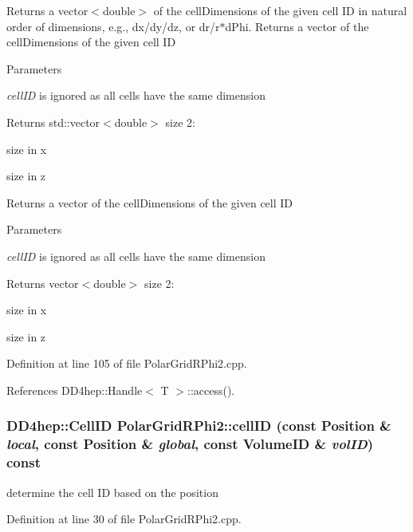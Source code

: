 Returns a vector$<$double$>$ of the cellDimensions of the given cell ID in natural order of dimensions, e.g., dx/dy/dz, or dr/r$\ast$dPhi. Returns a vector of the cellDimensions of the given cell ID 
\begin{DoxyParams}{Parameters}
\item[{\em cellID}]is ignored as all cells have the same dimension \end{DoxyParams}
\begin{DoxyReturn}{Returns}
std::vector$<$double$>$ size 2:
\begin{DoxyEnumerate}
\item size in x
\item size in z
\end{DoxyEnumerate}
\end{DoxyReturn}
Returns a vector of the cellDimensions of the given cell ID 
\begin{DoxyParams}{Parameters}
\item[{\em cellID}]is ignored as all cells have the same dimension \end{DoxyParams}
\begin{DoxyReturn}{Returns}
vector$<$double$>$ size 2:
\begin{DoxyEnumerate}
\item size in x
\item size in z 
\end{DoxyEnumerate}
\end{DoxyReturn}


Definition at line 105 of file PolarGridRPhi2.cpp.

References DD4hep::Handle$<$ T $>$::access().\hypertarget{class_d_d4hep_1_1_geometry_1_1_polar_grid_r_phi2_a26ecb558de4d95a8e3619704d5a6d528}{
\subsubsection[{cellID}]{\setlength{\rightskip}{0pt plus 5cm}DD4hep::CellID PolarGridRPhi2::cellID (const {\bf Position} \& {\em local}, \/  const {\bf Position} \& {\em global}, \/  const VolumeID \& {\em volID}) const}}
\label{class_d_d4hep_1_1_geometry_1_1_polar_grid_r_phi2_a26ecb558de4d95a8e3619704d5a6d528}


determine the cell ID based on the position 

Definition at line 30 of file PolarGridRPhi2.cpp.

